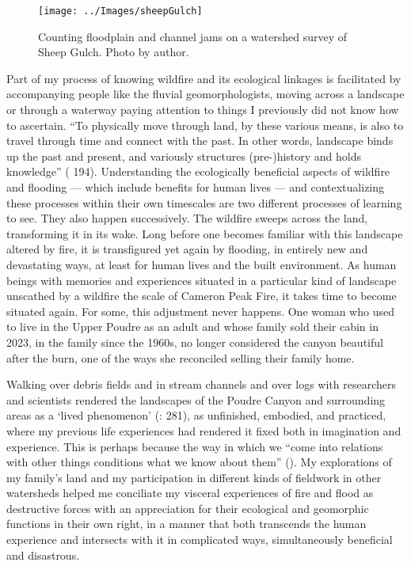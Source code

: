 \documentclass[
]{article}
\begin{document}
\begin{figure}
\texttt{[image: ../Images/sheepGulch]} \caption[Sheep Creek survey]{Counting floodplain and channel jams on a watershed survey of Sheep Gulch. Photo by author.}\label{fig:figureTitle-25}
\end{figure}

Part of my process of knowing wildfire and its ecological linkages is facilitated by accompanying people like the fluvial geomorphologists, moving across a landscape or through a waterway paying attention to things I previously did not know how to ascertain. ``To physically move through land, by these various means, is also to travel through time and connect with the past. In other words, landscape binds up the past and present, and variously structures (pre-)history and holds knowledge'' ( 194). Understanding the ecologically beneficial aspects of wildfire and flooding --- which include benefits for human lives --- and contextualizing these processes within their own timescales are two different processes of learning to see. They also happen successively. The wildfire sweeps across the land, transforming it in its wake. Long before one becomes familiar with this landscape altered by fire, it is transfigured yet again by flooding, in entirely new and devastating ways, at least for human lives and the built environment. As human beings with memories and experiences situated in a particular kind of landscape unscathed by a wildfire the scale of Cameron Peak Fire, it takes time to become situated again. For some, this adjustment never happens. One woman who used to live in the Upper Poudre as an adult and whose family sold their cabin in 2023, in the family since the 1960s, no longer considered the canyon beautiful after the burn, one of the ways she reconciled selling their family home.

Walking over debris fields and in stream channels and over logs with researchers and scientists rendered the landscapes of the Poudre Canyon and surrounding areas as a `lived phenomenon' (: 281), as unfinished, embodied, and practiced, where my previous life experiences had rendered it fixed both in imagination and experience. This is perhaps because the way in which we ``come into relations with other things conditions what we know about them'' (). My explorations of my family's land and my participation in different kinds of fieldwork in other watersheds helped me conciliate my visceral experiences of fire and flood as destructive forces with an appreciation for their ecological and geomorphic functions in their own right, in a manner that both transcends the human experience and intersects with it in complicated ways, simultaneously beneficial and disastrous.
\end{document}
